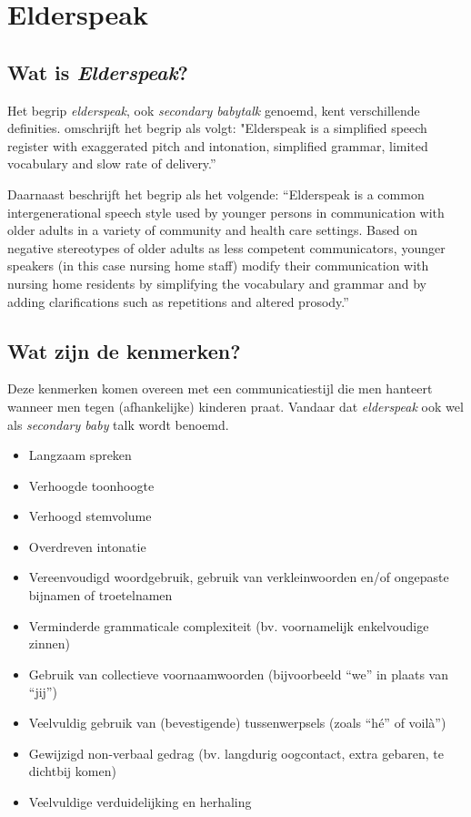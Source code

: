 \section{Elderspeak}

\subsection{Wat is \textit{Elderspeak}?}

Het begrip \textit{elderspeak}, ook \textit{secondary babytalk} genoemd, kent verschillende definities. \textcite{Kemper_1998} omschrijft het begrip als volgt:
"Elderspeak is a simplified speech register with exaggerated pitch and intonation, simplified grammar, limited vocabulary and slow rate of delivery.”

Daarnaast beschrijft \textcite{Williams2011} het begrip als het volgende:
“Elderspeak is a common intergenerational speech style used by younger persons in communication with older adults in a variety of community and health care settings. Based on negative stereotypes of older adults as less competent communicators, younger speakers (in this case nursing home staff) modify their communication with nursing home residents by simplifying the vocabulary and grammar and by adding clarifications such as repetitions and altered prosody.”

\subsection{Wat zijn de kenmerken?}
Deze kenmerken komen overeen met een communicatiestijl die men hanteert wanneer men tegen (afhankelijke) kinderen praat. Vandaar dat \textit{elderspeak} ook wel als \textit{secondary baby} talk wordt benoemd.

\begin{itemize}
    \item Langzaam spreken
    \item Verhoogde toonhoogte
    \item Verhoogd stemvolume
    \item Overdreven intonatie
    \item Vereenvoudigd woordgebruik, gebruik van verkleinwoorden en/of ongepaste bijnamen of troetelnamen
    \item Verminderde grammaticale complexiteit (bv. voornamelijk enkelvoudige zinnen)
    \item Gebruik van collectieve voornaamwoorden (bijvoorbeeld “we” in plaats van “jij”)
    \item Veelvuldig gebruik van (bevestigende) tussenwerpsels (zoals “hé” of voilà”)
    \item Gewijzigd non-verbaal gedrag (bv. langdurig oogcontact, extra gebaren, te dichtbij komen)
    \item Veelvuldige verduidelijking en herhaling
\end{itemize}

